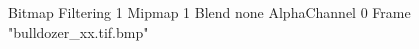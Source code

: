 {Bitmap
	{Filtering 1}
	{Mipmap 1}
	{Blend none}
	{AlphaChannel 0}
	{Frame "bulldozer_xx.tif.bmp"}
}
